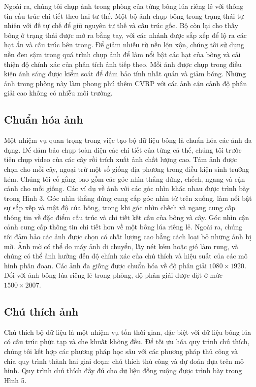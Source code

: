 \documentclass[12pt, a4paper]{article}
\begin{document}
Ngoài ra, chúng tôi chụp ảnh trong phòng của từng bông lúa riêng lẻ với thông tin cấu trúc
chi tiết theo hai tư thế. Một bộ ảnh chụp bông trong trạng thái tự nhiên với đế tự chế để
giữ nguyên tư thế và cấu trúc gốc. Bộ còn lại cho thấy bông ở trạng thái được mở ra bằng
tay, với các nhánh được sắp xếp để lộ ra các hạt ẩn và cấu trúc bên trong. Để giảm nhiễu từ
nền lộn xộn, chúng tôi sử dụng nền đen sậm trong quá trình chụp ảnh để làm nổi bật các hạt
của bông và cải thiện độ chính xác của phân tích ảnh tiếp theo. Mỗi ảnh được chụp trong điều
kiện ánh sáng được kiểm soát để đảm bảo tính nhất quán và giảm bóng. Những ảnh trong phòng
này làm phong phú thêm CVRP với các ảnh cận cảnh độ phân giải cao không có nhiễu môi trường.

\subsection{Chuẩn hóa ảnh}

Một nhiệm vụ quan trọng trong việc tạo bộ dữ liệu bông là chuẩn hóa các ảnh đa dạng. Để
đảm bảo chụp toàn diện các chi tiết của từng cá thể, chúng tôi trước tiên chụp video của
các cây rồi trích xuất ảnh chất lượng cao. Tám ảnh được chọn cho mỗi cây, ngoại trừ một số
giống địa phương trong điều kiện sinh trưởng kém. Chúng tôi cố gắng bao gồm các góc nhìn
thẳng đứng, chếch, ngang và cận cảnh cho mỗi giống. Các ví dụ về ảnh với các góc nhìn khác
nhau được trình bày trong Hình 3. Góc nhìn thẳng đứng cung cấp góc nhìn từ trên xuống, làm
nổi bật sự sắp xếp và mật độ của bông, trong khi góc nhìn chếch và ngang cung cấp thông tin
về đặc điểm cấu trúc và chi tiết kết cấu của bông và cây. Góc nhìn cận cảnh cung cấp thông
tin chi tiết hơn về một bông lúa riêng lẻ. Ngoài ra, chúng tôi đảm bảo các ảnh được chọn có
chất lượng cao bằng cách loại bỏ những ảnh bị mờ. Ảnh mờ có thể do máy ảnh di chuyển, lấy
nét kém hoặc gió làm rung, và chúng có thể ảnh hưởng đến độ chính xác của chú thích và hiệu
suất của các mô hình phân đoạn. Các ảnh đa giống được chuẩn hóa về độ phân giải $1080 \times
1920$. Đối với ảnh bông lúa riêng lẻ trong phòng, độ phân giải được đặt ở mức $1500 \times
2007$.

\subsection{Chú thích ảnh}

Chú thích bộ dữ liệu là một nhiệm vụ tốn thời gian, đặc biệt với dữ liệu bông lúa có cấu
trúc phức tạp và che khuất không đều. Để tối ưu hóa quy trình chú thích, chúng tôi kết hợp
các phương pháp học sâu với các phương pháp thủ công và chia quy trình thành hai giai đoạn:
chú thích thủ công và dự đoán dựa trên mô hình. Quy trình chú thích đầy đủ cho dữ liệu đồng
ruộng được trình bày trong Hình 5.
\end{document}
